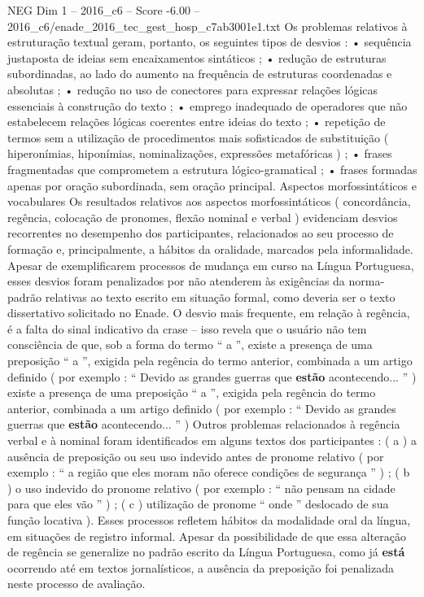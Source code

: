 \begin{textsample}{NEG Dim 1 – 2016\_c6 – Score -6.00 – 2016\_c6/enade\_2016\_tec\_gest\_hosp\_c7ab3001e1.txt}
Os problemas relativos à estruturação textual geram, portanto, os seguintes tipos de desvios : • sequência justaposta de ideias sem encaixamentos sintáticos ; • redução de estruturas subordinadas, ao lado do aumento na frequência de estruturas coordenadas e absolutas ; • redução no uso de conectores para expressar relações lógicas essenciais à construção do texto ; • emprego inadequado de operadores que não estabelecem relações lógicas coerentes entre ideias do texto ; • repetição de termos sem a utilização de procedimentos mais sofisticados de substituição ( hiperonímias, hiponímias, nominalizações, expressões metafóricas ) ; • frases fragmentadas que comprometem a estrutura lógico-gramatical ; • frases formadas apenas por oração subordinada, sem oração principal.
Aspectos morfossintáticos e vocabulares Os resultados relativos aos aspectos morfossintáticos ( concordância, regência, colocação de pronomes, flexão nominal e verbal ) evidenciam desvios recorrentes no desempenho dos participantes, relacionados ao seu processo de formação e, principalmente, a hábitos da oralidade, marcados pela informalidade.
Apesar de exemplificarem processos de mudança em curso na Língua Portuguesa, esses desvios foram penalizados por não atenderem às exigências da norma-padrão relativas ao texto escrito em situação formal, como deveria ser o texto dissertativo solicitado no Enade.
O desvio mais frequente, em relação à regência, é a falta do sinal indicativo da crase – isso revela que o usuário não tem consciência de que, sob a forma do termo “ a ”, existe a presença de uma preposição “ a ”, exigida pela regência do termo anterior, combinada a um artigo definido ( por exemplo : “ Devido as grandes guerras que \textbf{estão} acontecendo... ” ) existe a presença de uma preposição “ a ”, exigida pela regência do termo anterior, combinada a um artigo definido ( por exemplo : “ Devido as grandes guerras que \textbf{estão} acontecendo... ” ) Outros problemas relacionados à regência verbal e à nominal foram identificados em alguns textos dos participantes : ( a ) a ausência de preposição ou seu uso indevido antes de pronome relativo ( por exemplo : “ a região que eles moram não oferece condições de segurança ” ) ; ( b ) o uso indevido do pronome relativo ( por exemplo : “ não pensam na cidade para que eles vão ” ) ; ( c ) utilização de pronome “ onde ” deslocado de sua função locativa ).
Esses processos refletem hábitos da modalidade oral da língua, em situações de registro informal.
Apesar da possibilidade de que essa alteração de regência se generalize no padrão escrito da Língua Portuguesa, como já \textbf{está} ocorrendo até em textos jornalísticos, a ausência da preposição foi penalizada neste processo de avaliação.

\end{textsample}
